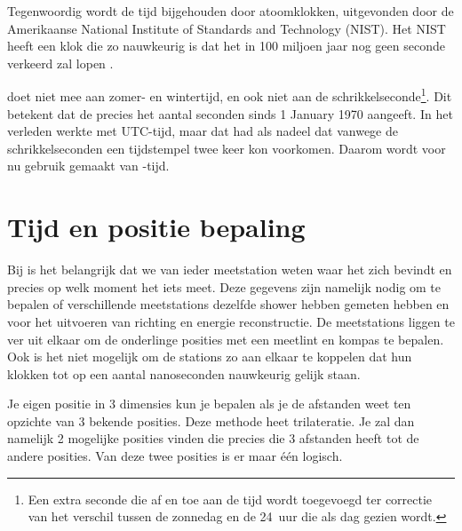 Tegenwoordig wordt de tijd bijgehouden door atoomklokken, uitgevonden door
de Amerikaanse National Institute of Standards and Technology (NIST).
Het NIST heeft een klok die zo nauwkeurig is dat het in 100 miljoen jaar
nog geen seconde verkeerd zal lopen \cite{nist2013ces}.

\gps doet niet mee aan zomer- en wintertijd, en ook niet aan de
schrikkelseconde\footnote{Een extra seconde die af en toe aan de tijd
wordt toegevoegd ter correctie van het verschil tussen de zonnedag en de
\SI{24}{uur} die als dag gezien wordt.}. Dit betekent dat de \gps
precies het aantal seconden sinds 1 January 1970 aangeeft. In het
verleden werkte \hisparc met UTC-tijd, maar dat had als nadeel dat
vanwege de schrikkelseconden een tijdstempel twee keer kon voorkomen.
Daarom wordt voor \hisparc nu gebruik gemaakt van \gps-tijd.


\section{Tijd en positie bepaling}

Bij \hisparc is het belangrijk dat we van ieder meetstation weten waar
het zich bevindt en precies op welk moment het iets meet. Deze gegevens
zijn namelijk nodig om te bepalen of verschillende meetstations dezelfde
shower hebben gemeten hebben en voor het uitvoeren van richting en
energie reconstructie. De meetstations liggen te ver uit elkaar om de
onderlinge posities met een meetlint en kompas te bepalen. Ook is het
niet mogelijk om de stations zo aan elkaar te koppelen dat hun klokken
tot op een aantal nanoseconden nauwkeurig gelijk staan.

Je eigen positie in 3 dimensies kun je bepalen als je de afstanden weet
ten opzichte van 3 bekende posities. Deze methode heet trilateratie. Je
zal dan namelijk 2 mogelijke posities vinden die precies die 3 afstanden
heeft tot de andere posities. Van deze twee posities is er maar \'e\'en
logisch.

